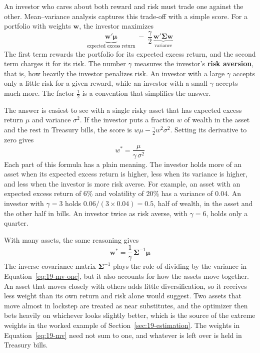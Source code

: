 An investor who cares about both reward and risk must trade one against the other. Mean--variance analysis captures this trade-off with a simple score. For a portfolio with weights $\mathbf{w}$, the investor maximizes
\begin{equation}
  \underbrace{\mathbf{w}'\boldsymbol{\mu}}_{\text{expected excess return}} \; - \; \frac{\gamma}{2}\,\underbrace{\mathbf{w}'\boldsymbol{\Sigma}\mathbf{w}}_{\text{variance}}
  \label{eq:19-mv-objective}
\end{equation}
The first term rewards the portfolio for its expected excess return, and the second term charges it for its risk. The number $\gamma$ measures the investor's \textbf{risk aversion}, that is, how heavily the investor penalizes risk. An investor with a large $\gamma$ accepts only a little risk for a given reward, while an investor with a small $\gamma$ accepts much more. The factor $\tfrac{1}{2}$ is a convention that simplifies the answer.

The answer is easiest to see with a single risky asset that has expected excess return $\mu$ and variance $\sigma^2$. If the investor puts a fraction $w$ of wealth in the asset and the rest in Treasury bills, the score is $w\mu - \tfrac{\gamma}{2} w^2 \sigma^2$. Setting its derivative to zero gives
\begin{equation}
  w^* = \frac{\mu}{\gamma\,\sigma^2}
  \label{eq:19-mv-one}
\end{equation}
Each part of this formula has a plain meaning. The investor holds more of an asset when its expected excess return is higher, less when its variance is higher, and less when the investor is more risk averse. For example, an asset with an expected excess return of 6\% and volatility of 20\% has a variance of 0.04. An investor with $\gamma = 3$ holds $0.06/(3 \times 0.04) = 0.5$, half of wealth, in the asset and the other half in bills. An investor twice as risk averse, with $\gamma = 6$, holds only a quarter.

With many assets, the same reasoning gives
\begin{equation}
  \mathbf{w}^* = \frac{1}{\gamma}\,\boldsymbol{\Sigma}^{-1}\boldsymbol{\mu}
  \label{eq:19-mv}
\end{equation}
The inverse covariance matrix $\boldsymbol{\Sigma}^{-1}$ plays the role of dividing by the variance in Equation~\eqref{eq:19-mv-one}, but it also accounts for how the assets move together. An asset that moves closely with others adds little diversification, so it receives less weight than its own return and risk alone would suggest. Two assets that move almost in lockstep are treated as near substitutes, and the optimizer then bets heavily on whichever looks slightly better, which is the source of the extreme weights in the worked example of Section~\ref{sec:19-estimation}. The weights in Equation~\eqref{eq:19-mv} need not sum to one, and whatever is left over is held in Treasury bills.

